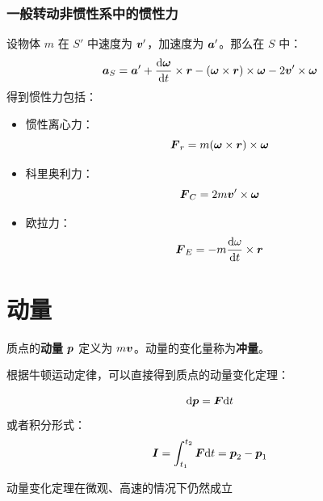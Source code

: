 \subsubsection{一般转动非惯性系中的惯性力}

设物体 $m$ 在 $S'$ 中速度为 $\boldsymbol{v}'$，加速度为 $\boldsymbol{a}'$。那么在 $S$ 中：
$$
\boldsymbol{a}_S = \boldsymbol{a}' + \dv{\boldsymbol{\omega}}{t} \times \boldsymbol{r} - (\boldsymbol{\omega} \times \boldsymbol{r}) \times \boldsymbol{\omega} - 2 \boldsymbol{v}' \times \boldsymbol{\omega}
$$
得到惯性力包括：
\begin{itemize}
    \item 惯性离心力：
    $$
    \boldsymbol{F}_r = m (\boldsymbol{\omega} \times \boldsymbol{r}) \times \boldsymbol{\omega}
    $$
    \item 科里奥利力：
    $$
    \boldsymbol{F}_C = 2 m \boldsymbol{v}' \times \boldsymbol{\omega}
    $$
    \item 欧拉力：
    $$
    \boldsymbol{F}_E = -m \dv{\omega}{t} \times \boldsymbol{r}
    $$
\end{itemize}

\section{动量}

\begin{definition}[动量和冲量]
    质点的\textbf{动量} $\boldsymbol{p}$ 定义为 $m \boldsymbol{v}$。动量的变化量称为\textbf{冲量}。
\end{definition}

根据牛顿运动定律，可以直接得到质点的动量变化定理：

\begin{theorem}[动量变化定理]
    $$
    \dd \boldsymbol{p} = \boldsymbol{F} \dd t
    $$
    或者积分形式：
    $$
    \boldsymbol{I} = \int_{t_1}^{t_2} \boldsymbol{F} \dd t = \boldsymbol{p}_2 - \boldsymbol{p}_1
    $$
\end{theorem}

动量变化定理在微观、高速的情况下仍然成立
